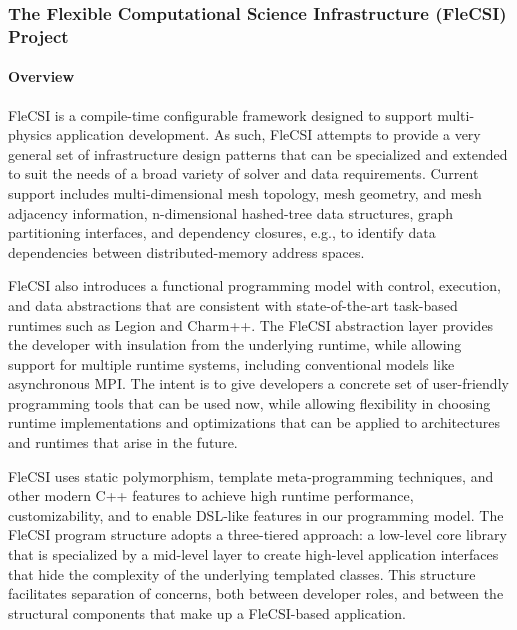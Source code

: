 \subsubsection{ The Flexible Computational Science Infrastructure (FleCSI) Project} 

\paragraph{Overview} 

FleCSI\cite{FleCSI} is a compile-time configurable framework designed to
support multi-physics application development. As such, FleCSI attempts
to provide a very general set of infrastructure design patterns that can
be specialized and extended to suit the needs of a broad variety of
solver and data requirements. Current support includes multi-dimensional
mesh topology, mesh geometry, and mesh adjacency information,
n-dimensional hashed-tree data structures, graph partitioning
interfaces, and dependency closures, e.g., to identify data dependencies
between distributed-memory address spaces.

FleCSI also introduces a functional programming model with control,
execution, and data abstractions that are consistent with state-of-the-art
task-based runtimes such as Legion\cite{Bauer:2012:LEL:2388996.2389086}
and Charm++\cite{Kale:1993:CPC:165854.165874,
Kale:1993:CPC:167962.165874}.  The FleCSI abstraction layer provides the
developer with insulation from the underlying runtime, while allowing
support for multiple runtime systems, including conventional models like
asynchronous MPI\cite{TheMPIForum:1993:MMP:169627.169855}.  The intent
is to give developers a concrete set of user-friendly programming tools
that can be used now, while allowing flexibility in choosing runtime
implementations and optimizations that can be applied to architectures
and runtimes that arise in the future.

FleCSI uses static polymorphism, template meta-programming techniques,
and other modern C++ features to achieve high runtime performance,
customizability, and to enable DSL-like features in our programming
model. The FleCSI program structure adopts a three-tiered approach: a
low-level core library that is specialized by a mid-level layer to
create high-level application interfaces that hide the complexity of the
underlying templated classes. This structure facilitates separation of
concerns, both between developer roles, and between the structural
components that make up a FleCSI-based application.

